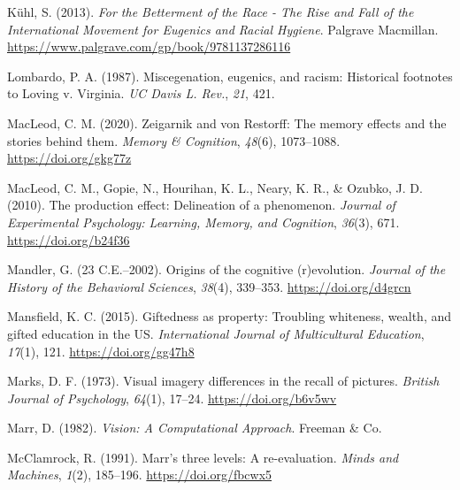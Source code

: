 \documentclass[
  oneside,
  12pt]{crumpbook}
\newlength{\cslhangindent}
\newlength{\cslentryspacingunit} %
\newenvironment{CSLReferences}[2] %
 {%
  \setlength{\parindent}{0pt}
  \ifodd #1
  \let\oldpar\par
  \def\par{\hangindent=\cslhangindent\oldpar}
  \fi
  \setlength{\parskip}{#2\cslentryspacingunit}
 }%
 {}
\begin{document}
\begin{CSLReferences}{1}{0}
\leavevmode{}%
Kühl, S. (2013). \emph{For the {Betterment} of the {Race} - {The Rise} and {Fall} of the {International Movement} for {Eugenics} and {Racial Hygiene}}. {Palgrave Macmillan}. \url{https://www.palgrave.com/gp/book/9781137286116}

\leavevmode{}%
Lombardo, P. A. (1987). Miscegenation, eugenics, and racism: {Historical} footnotes to {Loving} v. {Virginia}. \emph{UC Davis L. Rev.}, \emph{21}, 421.

\leavevmode{}%
MacLeod, C. M. (2020). Zeigarnik and von {Restorff}: {The} memory effects and the stories behind them. \emph{Memory \& Cognition}, \emph{48}(6), 1073--1088. \url{https://doi.org/gkg77z}

\leavevmode{}%
MacLeod, C. M., Gopie, N., Hourihan, K. L., Neary, K. R., \& Ozubko, J. D. (2010). The production effect: Delineation of a phenomenon. \emph{Journal of Experimental Psychology: Learning, Memory, and Cognition}, \emph{36}(3), 671. \url{https://doi.org/b24f36}

\leavevmode{}%
Mandler, G. (23 C.E.--2002). Origins of the cognitive (r)evolution. \emph{Journal of the History of the Behavioral Sciences}, \emph{38}(4), 339--353. \url{https://doi.org/d4grcn}

\leavevmode{}%
Mansfield, K. C. (2015). Giftedness as property: {Troubling} whiteness, wealth, and gifted education in the {US}. \emph{International Journal of Multicultural Education}, \emph{17}(1), 121. \url{https://doi.org/gg47h8}

\leavevmode{}%
Marks, D. F. (1973). Visual imagery differences in the recall of pictures. \emph{British Journal of Psychology}, \emph{64}(1), 17--24. \url{https://doi.org/b6v5wv}

\leavevmode{}%
Marr, D. (1982). \emph{Vision: {A Computational Approach}}. {Freeman \& Co}.

\leavevmode{}%
McClamrock, R. (1991). Marr's three levels: {A} re-evaluation. \emph{Minds and Machines}, \emph{1}(2), 185--196. \url{https://doi.org/fbcwx5}


\end{CSLReferences}
\end{document}
